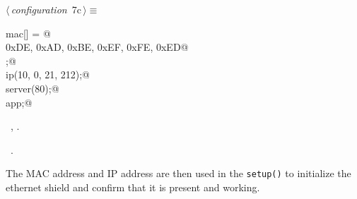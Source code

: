 \documentclass[a4paper, 11pt]{article}
\begin{document}
\begin{flushleft} \small
\begin{minipage}{\linewidth}\label{scrap8}\raggedright\small
{}$\langle\,${\itshape configuration}\nobreak\ {\footnotesize{7c}}$\,\rangle\equiv$
\vspace{-1ex}
\begin{list}{}{\setlength{\leftmargin}{1em}} \item
\mbox{}\lstinline@byte mac[] = {@\\
\mbox{}\lstinline@  0xDE, 0xAD, 0xBE, 0xEF, 0xFE, 0xED@\\
\mbox{}\lstinline@};@\\
\mbox{}\lstinline@IPAddress ip(10, 0, 21, 212);@\\
\mbox{}\lstinline@EthernetServer server(80);@\\
\mbox{}\lstinline@Application app;@\\
\mbox{}{\NWsep}
\end{list}
\vspace{-1ex}
\vspace{-1ex}
\footnotesize
\begin{list}{}{\setlength{\itemsep}{-\parsep}\setlength{\itemindent}{-\leftmargin}}
\item \NWtxtMacroDefBy\ , .
\item \NWtxtMacroRefIn\ .
\end{list}
\end{minipage}
\end{flushleft}

The MAC address and IP address are then used in the \verb|setup()|
to initialize the ethernet shield
and confirm that it is present and working.
\end{document}
